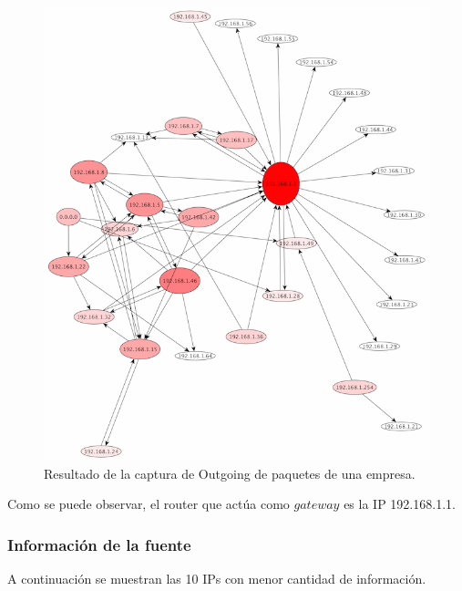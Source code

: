 \documentclass[10pt, a4paper]{article}
\begin{document}
\begin{figure}[H] %
\begin{center}
\includegraphics[width=400pt]{../imgs/tiarg-outgoing.png}
\caption{Resultado de la captura de Outgoing de paquetes de una empresa.}
\end{center}
\end{figure}

Como se puede observar, el router que actúa como $gateway$ es la IP 192.168.1.1.

\subsubsection{Información de la fuente}

A continuación se muestran las 10 IPs con menor cantidad de información.
\end{document}
